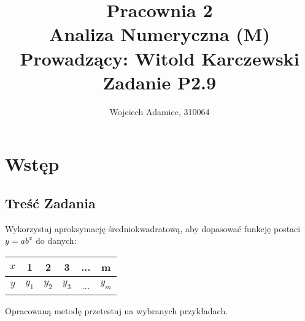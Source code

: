 \documentclass[12pt,a4paper]{article}
\begin{document}
\author{Wojciech Adamiec, 310064}
\title{
	\textbf{Pracownia 2}\\
	\large Analiza Numeryczna (M)\\
	\large Prowadzący: Witold Karczewski\\
	\large Zadanie P2.9	
}

\maketitle

\tableofcontents
\section{Wstęp}


\subsection{Treść Zadania}
Wykorzystaj aproksymację średniokwadratową, aby dopasować funkcję postaci $y=ab^x$ do danych:\\
\begin{center}
	\begin{tabular}{|c|c|c|c|c|c|} \hline
	$x$ & 1     & 2     & 3     & ... & m   \\ \hline
	$y$ & $y_1$ & $y_2$ & $y_3$ & ... & $y_m$   \\ \hline
	\end{tabular}
\end{center}
Opracowaną metodę przetestuj na wybranych przykładach.
\end{document}
